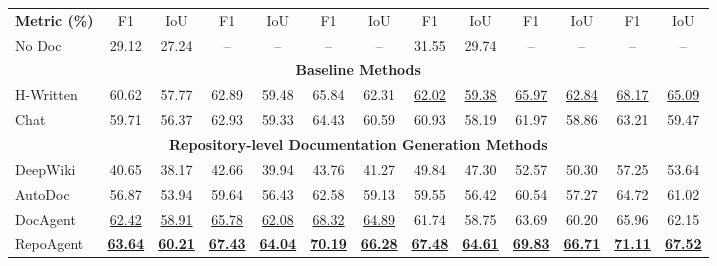 \begin{table}[t]
\begin{tabular}{l|cc|cc|cc|cc|cc|cc}
\midrule
\rowcolor{myblue} \multicolumn{13}{c}{\textbf{Functionality Localization}} \\ \midrule
\rowcolor{gray!20} \textbf{Metric (\%)} & F1 & IoU & F1 & IoU & F1 & IoU & F1 & IoU & F1 & IoU & F1 & IoU \\
\midrule
No Doc & 29.12 & 27.24 & -- & -- & -- & -- & 31.55 & 29.74 & -- & -- & -- & -- \\ \midrule
 \multicolumn{13}{c}{\textbf{Baseline Methods}} \\ \midrule
H-Written & 60.62 & 57.77 & 62.89 & 59.48 & 65.84 & 62.31 & \underline{62.02} & \underline{59.38} & \underline{65.97} & \underline{62.84} & \underline{68.17} & \underline{65.09} \\
Chat & 59.71 & 56.37 & 62.93 & 59.33 & 64.43 & 60.59 & 60.93 & 58.19 & 61.97 & 58.86 & 63.21 & 59.47 \\
\midrule
 \multicolumn{13}{c}{\textbf{Repository-level Documentation Generation Methods}} \\ \midrule
DeepWiki & 40.65 & 38.17 & 42.66 & 39.94 & 43.76 & 41.27 & 49.84 & 47.30 & 52.57 & 50.30 & 57.25 & 53.64 \\
AutoDoc & 56.87 & 53.94 & 59.64 & 56.43 & 62.58 & 59.13 & 59.55 & 56.42 & 60.54 & 57.27 & 64.72 & 61.02 \\
DocAgent & \underline{62.42} & \underline{58.91} & \underline{65.78} & \underline{62.08} & \underline{68.32} & \underline{64.89} & 61.74 & 58.75 & 63.69 & 60.20 & 65.96 & 62.15 \\
RepoAgent & \underline{\textbf{63.64}} & \underline{\textbf{60.21}} & \underline{\textbf{67.43}} & \underline{\textbf{64.04}} & \underline{\textbf{70.19}} & \underline{\textbf{66.28}} & \underline{\textbf{67.48}} & \underline{\textbf{64.61}} & \underline{\textbf{69.83}} & \underline{\textbf{66.71}} & \underline{\textbf{71.11}} & \underline{\textbf{67.52}} \\ \midrule


\end{tabular}
\end{table}
